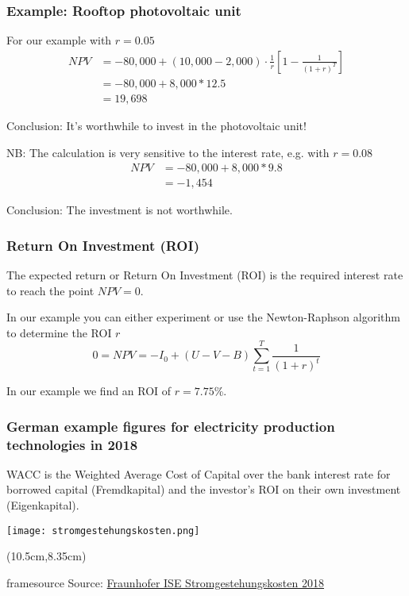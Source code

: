 \documentclass[10pt,aspectratio=169,dvipsnames]{beamer}
\newcommand{\source}[1]{\begin{textblock*}{5cm}(10.5cm,8.35cm)
    \begin{beamercolorbox}[ht=0.5cm,right]{framesource}
        \usebeamerfont{framesource}\usebeamercolor[fg]{framesource} Source: {#1}
    \end{beamercolorbox}
\end{textblock*}}
\begin{document}
\begin{frame}
  \frametitle{Example: Rooftop photovoltaic unit}

  For our example with $r= 0.05$
  \begin{align*}
    NPV & = -80,000 + (10,000 - 2,000)  \cdot \frac{1}{r} \left[1  - \frac{1}{(1+r)^{T}}  \right] \\
    & = -80,000 + 8,000*12.5 \\
    & = 19,698
  \end{align*}

  \alert{Conclusion:} It's worthwhile to invest in the photovoltaic unit!

  \pause

  NB: The calculation is very sensitive to the interest rate, e.g. with $r = 0.08$
  \begin{align*}
    NPV & = -80,000 + 8,000*9.8 \\
    & = -1,454
  \end{align*}

  \alert{Conclusion:} The investment is not worthwhile.

\end{frame}

\begin{frame}
  \frametitle{Return On Investment (ROI)}

  The expected return or \alert{Return On Investment (ROI)} is the required interest rate to reach the point $NPV = 0$.

  In our example you can either experiment or use the Newton-Raphson algorithm to determine the ROI $r$
  \begin{equation*}
    0 = NPV = -I_0 + (U - V - B) \sum_{t=1}^T \frac{1}{(1+r)^t}
  \end{equation*}

  In our example we find an ROI of $r=7.75$\%.

\end{frame}



\begin{frame}
  \frametitle{German example figures for electricity production technologies in 2018}

  WACC is the \alert{Weighted Average Cost of Capital} over the bank interest rate for borrowed capital (Fremdkapital) and the investor's ROI on their own investment (Eigenkapital).

  \centering
  \texttt{[image: stromgestehungskosten.png]}


  \source{\href{https://www.ise.fraunhofer.de/content/dam/ise/de/documents/publications/studies/DE2018_ISE_Studie_Stromgestehungskosten_Erneuerbare_Energien.pdf}{Fraunhofer ISE Stromgestehungskosten 2018}}

\end{frame}
\end{document}
